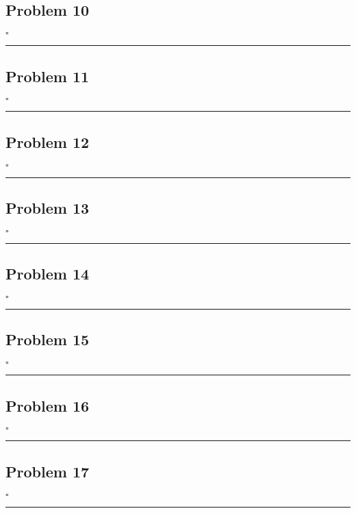 \documentclass[12pt]{article}
\newcommand*{\QEDB}{\hfill\ensuremath{\square}}
\newcommand{\horrule}[1]{\rule{\linewidth}{#1}}
\begin{document}
\subsection*{Problem 10}

\QEDB

\horrule{0.5pt}

\subsection*{Problem 11}

\QEDB

\horrule{0.5pt}

\subsection*{Problem 12}

\QEDB

\horrule{0.5pt}

\subsection*{Problem 13}

\QEDB

\horrule{0.5pt}

\subsection*{Problem 14}

\QEDB

\horrule{0.5pt}

\subsection*{Problem 15}

\QEDB

\horrule{0.5pt}

\subsection*{Problem 16}

\QEDB

\horrule{0.5pt}

\subsection*{Problem 17}

\QEDB

\horrule{0.5pt}
\end{document}
